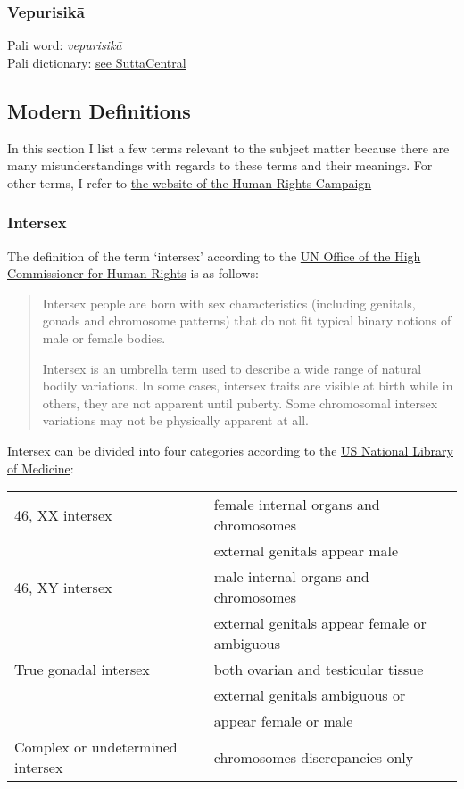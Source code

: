 \subsubsection{Vepurisikā}
Pali word: {\em vepurisikā} \\
Pali dictionary: \href{https://suttacentral.net/define/vepurisik%C4%81}{see SuttaCentral} \\

\subsection{Modern Definitions}
In this section I list a few terms relevant to the subject matter because there are many misunderstandings with regards to these terms and their meanings. For other terms, I refer to \href{https://www.hrc.org/resources/glossary-of-terms}{the website of the Human Rights Campaign}

\subsubsection{Intersex}
\label{intersex}
The definition of the term `intersex' according to the \href{https://unfe.org/system/unfe-65-Intersex_Factsheet_ENGLISH.pdf}{UN Office of the High Commissioner for Human Rights} is as follows:

\begin{quote}
Intersex people are born with sex characteristics (including genitals, gonads and chromosome patterns) that do not fit typical binary notions of male or female bodies.

Intersex is an umbrella term used to describe a wide range of natural bodily variations. In some cases, intersex traits are visible at birth while in others, they are not apparent until puberty. Some chromosomal intersex variations may not be physically apparent at all.
\end{quote}

Intersex can be divided into four categories according to the \href{https://medlineplus.gov/ency/article/001669.htm}{US National Library of Medicine}:

\begin{tabular}{ l l }
46, XX intersex & female internal organs and chromosomes \\
& external genitals appear male \\
46, XY intersex & male internal organs and chromosomes \\
& external genitals appear female or ambiguous \\
True gonadal intersex & both ovarian and testicular tissue \\
& external genitals ambiguous or \\
& appear female or male \\
Complex or undetermined intersex & chromosomes discrepancies only \\
\end{tabular}


